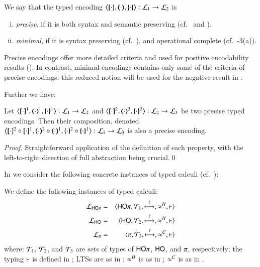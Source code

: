 \begin{definition}\myrm
	\label{def:goodenc}
	We say that  the typed encoding 
	$\enco{\map{\cdot}, \mapt{\cdot}, \mapa{\cdot}}: \tyl{L}_1 \to \tyl{L}_2$ is 
%
	\begin{enumerate}[(i)]
		\item	\emph{precise}, if it is both syntax and semantic preserving
			(cf.~ and ).

		\item	\emph{minimal}, if it is syntax preserving 
			(cf.~),
			and operational complete (cf.~-3(a)).
	\end{enumerate}
\end{definition}

Precise encodings offer more detailed criteria and used for positive 
encodability results ().
In contrast, minimal encodings contains only 
some of the criteria of precise encodings:    
this reduced notion will be used 
for the negative result in . 

Further we have:
\begin{proposition}\myrm
	\label{prop:enc_composability}
	Let %
	$\enco{\pmap{\cdot}{1}, \tmap{\cdot}{1}, \mapa{\cdot}^{1}}: \tyl{L}_1 \to \tyl{L}_2$
	and 
	$\enco{\pmap{\cdot}{2}, \tmap{\cdot}{2}, \mapa{\cdot}^{2}}: \tyl{L}_2 \to \tyl{L}_3$
	be two precise typed encodings.
	Then their composition, denoted 
	$\enco{\pmap{\cdot}{2} \circ \pmap{\cdot}{1}, \tmap{\cdot}{2} \circ \tmap{\cdot}{1}, \mapa{\cdot}^{2}\circ \mapa{\cdot}^{1}}: \tyl{L}_1 \to \tyl{L}_3$
	is also a precise encoding.
\end{proposition}

\begin{proof}
	Straightforward application of the definition of each property, with the left-to-right direction of
	full abstraction being crucial.\qed
\end{proof}

In  %
we consider the following concrete instances of typed calculi
(cf.~):


\begin{definition}\myrm
	We define the following instances of typed calculi:
	\begin{eqnarray*}
	\mathcal{L}_{\mathsf{HO}\pi}&=&\langle \mathsf{HO}\pi, {\cal{T}}_1, \stackrel{\ell}{\longmapsto}, \approx^{H}, \vdash \rangle \\
	\mathcal{L}_{\mathsf{HO}}&=&\langle \mathsf{HO}, {\cal{T}}_2, \stackrel{\ell}{\longmapsto}, \approx^{H}, \vdash \rangle \\
	\mathcal{L}_{\pi}&=&\langle \pi, {\cal{T}}_3, \stackrel{\ell}{\longmapsto}, \approx^{C}, \vdash \rangle
	\end{eqnarray*}
	where: 
	${\cal{T}}_1$, ${\cal{T}}_2$, 
	and ${\cal{T}}_3$
	are sets of types of $\mathsf{HO}\pi$, $\mathsf{HO}$, and $\pi$, respectively;
	the typing $\vdash$ is defined in 
	;  
	LTSs are as in ;
	$\approx^{H}$ is as in ; 
	$\approx^{C}$ is as in .
\end{definition}


